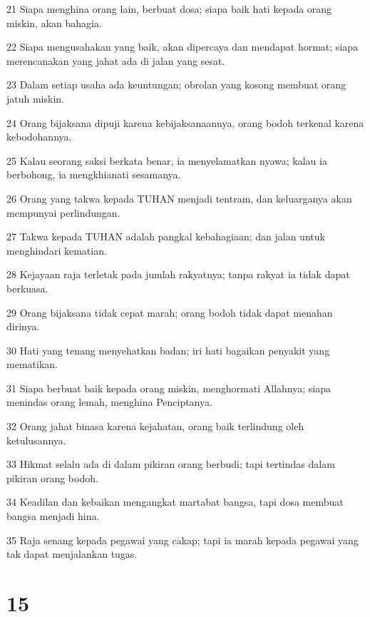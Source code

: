 \par 21 Siapa menghina orang lain, berbuat dosa; siapa baik hati kepada orang miskin, akan bahagia.
\par 22 Siapa mengusahakan yang baik, akan dipercaya dan mendapat hormat; siapa merencanakan yang jahat ada di jalan yang sesat.
\par 23 Dalam setiap usaha ada keuntungan; obrolan yang kosong membuat orang jatuh miskin.
\par 24 Orang bijaksana dipuji karena kebijaksanaannya, orang bodoh terkenal karena kebodohannya.
\par 25 Kalau seorang saksi berkata benar, ia menyelamatkan nyawa; kalau ia berbohong, ia mengkhianati sesamanya.
\par 26 Orang yang takwa kepada TUHAN menjadi tentram, dan keluarganya akan mempunyai perlindungan.
\par 27 Takwa kepada TUHAN adalah pangkal kebahagiaan; dan jalan untuk menghindari kematian.
\par 28 Kejayaan raja terletak pada jumlah rakyatnya; tanpa rakyat ia tidak dapat berkuasa.
\par 29 Orang bijaksana tidak cepat marah; orang bodoh tidak dapat menahan dirinya.
\par 30 Hati yang tenang menyehatkan badan; iri hati bagaikan penyakit yang mematikan.
\par 31 Siapa berbuat baik kepada orang miskin, menghormati Allahnya; siapa menindas orang lemah, menghina Penciptanya.
\par 32 Orang jahat binasa karena kejahatan, orang baik terlindung oleh ketulusannya.
\par 33 Hikmat selalu ada di dalam pikiran orang berbudi; tapi tertindas dalam pikiran orang bodoh.
\par 34 Keadilan dan kebaikan mengangkat martabat bangsa, tapi dosa membuat bangsa menjadi hina.
\par 35 Raja senang kepada pegawai yang cakap; tapi ia marah kepada pegawai yang tak dapat menjalankan tugas.

\chapter{15}

